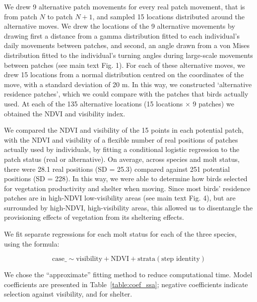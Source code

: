 We drew 9 alternative patch movements for every real patch movement, that is from patch $N$ to patch $N+1$, and sampled 15 locations distributed around the alternative moves.
We drew the locations of the 9 alternative movements by drawing first a distance from a gamma distribution fitted to each individual's daily movements between patches, and second, an angle drawn from a von Mises distribution fitted to the individual's turning angles during large-scale movements between patches (see main text Fig. 1).
For each of these alternative moves, we drew 15 locations from a normal distribution centred on the coordinates of the move, with a standard deviation of 20 m.
In this way, we constructed `alternative residence patches', which we could compare with the patches that birds actually used.
At each of the 135 alternative locations (15 locations $\times$ 9 patches) we obtained the NDVI and visibility index.

We compared the NDVI and visibility of the 15 points in each potential patch, with the NDVI and visibility of a flexible number of real positions of patches actually used by individuals, by fitting a conditional logistic regression to the patch status (real or alternative).
On average, across species and molt status, there were 28.1 real positions (SD = 25.3) compared against 251 potential positions (SD = 228).
In this way, we were able to determine how birds selected for vegetation productivity and shelter when moving.
Since most birds' residence patches are in high-NDVI low-visibility areas (see main text Fig. 4), but are surrounded by high-NDVI, high-visibility areas, this allowed us to disentangle the provisioning effects of vegetation from its sheltering effects.

We fit separate regressions for each molt status for each of the three species, using the formula:
\begin{linenomath*}
$$ \text{case\_} \sim \text{visibility} + \text{NDVI} + \text{strata}(\text{step~identity}) $$
\end{linenomath*}
We chose the ``approximate'' fitting method to reduce computational time.
Model coefficients are presented in Table~\ref{table:coef_ssa}; negative coefficients indicate selection against visibility, and for shelter.

